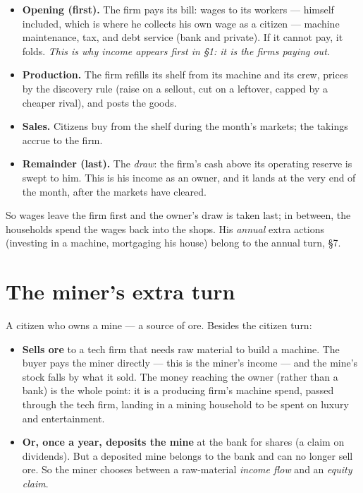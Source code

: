 \documentclass[11pt]{article}
\begin{document}
\begin{itemize}
\item \textbf{Opening (first).} The firm pays its bill: wages to its workers ---
himself included, which is where he collects his own wage as a citizen ---
machine maintenance, tax, and debt service (bank and private). If it cannot pay,
it folds. \emph{This is why income appears first in \S1: it is the firms paying
out.}
\item \textbf{Production.} The firm refills its shelf from its machine and its
crew, prices by the discovery rule (raise on a sellout, cut on a leftover, capped
by a cheaper rival), and posts the goods.
\item \textbf{Sales.} Citizens buy from the shelf during the month's markets; the
takings accrue to the firm.
\item \textbf{Remainder (last).} The \emph{draw}: the firm's cash above its
operating reserve is swept to him. This is his income as an owner, and it lands
at the very end of the month, after the markets have cleared.
\end{itemize}

So wages leave the firm first and the owner's draw is taken last; in between, the
households spend the wages back into the shops. His \emph{annual} extra actions
(investing in a machine, mortgaging his house) belong to the annual turn, \S7.

\section{The miner's extra turn}

A citizen who owns a mine --- a source of ore. Besides the citizen turn:

\begin{itemize}
\item \textbf{Sells ore} to a tech firm that needs raw material to build a
machine. The buyer pays the miner directly --- this is the miner's income --- and
the mine's stock falls by what it sold. The money reaching the owner (rather than
a bank) is the whole point: it is a producing firm's machine spend, passed through
the tech firm, landing in a mining household to be spent on luxury and
entertainment.
\item \textbf{Or, once a year, deposits the mine} at the bank for shares (a claim
on dividends). But a deposited mine belongs to the bank and can no longer sell
ore. So the miner chooses between a raw-material \emph{income flow} and an
\emph{equity claim}.
\end{itemize}
\end{document}
